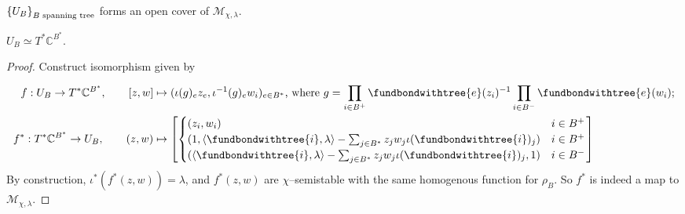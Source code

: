 \documentclass[b5paper]{article}
\newcommand{\MM}{\mathcal{M}}
\begin{document}
\begin{proposition}[pps:]{}
  $\left\{U_B\right\}_{B \textnormal{ spanning tree}}$ forms an open cover of $\MM_{\chi,\lambda}$.
\end{proposition}

\begin{proposition}[pps:]{}
  $U_B\simeq T^*\mathbb{C}^{B^*}$.
  \begin{proof}
      Construct isomorphism given by
      \begin{alignat*}{1}
          f:U_B\rightarrow T^*\mathbb{C}^{B^*}, \qquad [z,w]&\mapsto (\iota(g)_ez_e,\iota^{-1}(g)_ew_i)_{e\in B^*}\textnormal{, where }g=\prod_{i\in B^+}^{}\fundbondwithtree{e}(z_i)^{-1}\prod_{i\in B^-}^{}\fundbondwithtree{e}(w_i);\\
          f^*:T^*\mathbb{C}^{B^*}\rightarrow U_B, \qquad (z,w)&\mapsto 
          \left[
              \begin{cases}
                  (z_i,w_i)&i\in B^+\\
                  (1, \AB{\fundbondwithtree{i},\lambda}-\sum_{j\in B^*}^{}z_jw_j\iota(\fundbondwithtree{i})_j) &i\in B^+\\
                  (\AB{\fundbondwithtree{i},\lambda}-\sum_{j\in B^*}^{}z_jw_j\iota(\fundbondwithtree{i})_j,1) &i\in B^-\\
              \end{cases}
          \right]
      \end{alignat*}
      By construction, $\iota^*(f^*(z,w))=\lambda$, and $f^*(z,w)$ are $\chi$--semistable with the same homogenous function for $\rho_{B}$. So $f^*$ is indeed a map to $\MM_{\chi,\lambda}$.
  \end{proof}
\end{proposition}
\end{document}
